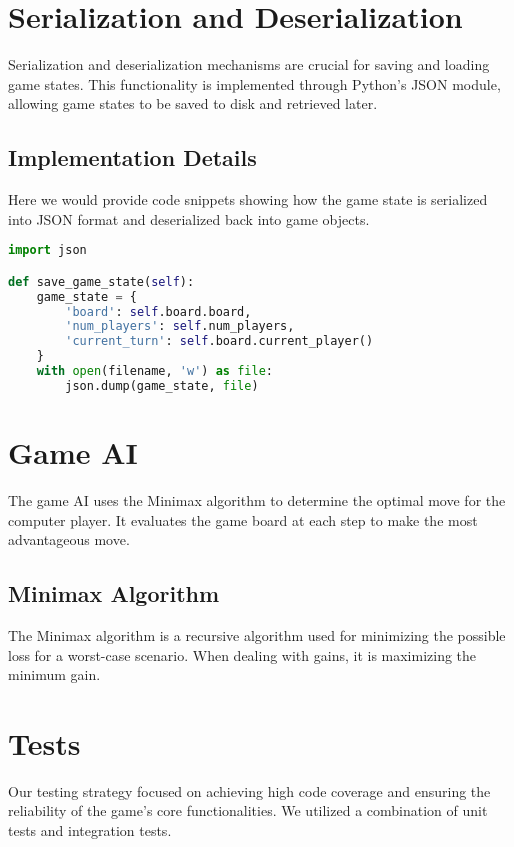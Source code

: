 \documentclass[12pt]{article}
\begin{document}
\newpage

\section{Serialization and Deserialization}
Serialization and deserialization mechanisms are crucial for saving and loading game states. This functionality is implemented through Python's JSON module, allowing game states to be saved to disk and retrieved later.

\subsection{Implementation Details}
Here we would provide code snippets showing how the game state is serialized into JSON format and deserialized back into game objects.

\begin{lstlisting}[language=Python, caption=Serialization Example]
import json

def save_game_state(self):
    game_state = {
        'board': self.board.board,
        'num_players': self.num_players,
        'current_turn': self.board.current_player()
    }
    with open(filename, 'w') as file:
        json.dump(game_state, file)
\end{lstlisting}

\section{Game AI}
The game AI uses the Minimax algorithm to determine the optimal move for the computer player. It evaluates the game board at each step to make the most advantageous move.

\subsection{Minimax Algorithm}
The Minimax algorithm is a recursive algorithm used for minimizing the possible loss for a worst-case scenario. When dealing with gains, it is maximizing the minimum gain.

\section{Tests}
Our testing strategy focused on achieving high code coverage and ensuring the reliability of the game's core functionalities. We utilized a combination of unit tests and integration tests.
\end{document}
